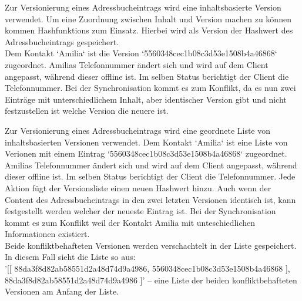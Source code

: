 \begin{description}[leftmargin=0.5cm,style=nextline]
  \item[Szenario V3 -- Inhaltsbasierte Version:]%
    Zur Versionierung eines Adressbucheintrags wird eine inhaltsbasierte Version verwendet. Um eine Zuordnung zwischen Inhalt und Version machen zu können kommen \Glspl{Hashfunktion} zum Einsatz. Hierbei wird als Version der Hashwert des Adressbucheintrags gespeichert.\\
    Dem Kontakt `Amilia` ist die Version `5560348cec1b08c3d53e1508b4a46868` zugeordnet. Amilias Telefonnummer ändert sich und wird auf dem Client angepasst, während dieser offline ist.
    Im selben Status berichtigt der Client die Telefonnummer. Bei der Synchronisation kommt es zum Konflikt, da es nun zwei Einträge mit unterschiedlichem Inhalt, aber identischer Version gibt und nicht festzustellen ist welche Version die neuere ist.\\
  \item[Szenario V4 -- Liste von inhaltsbasierten Versionen:]
    Zur Versionierung eines Adressbucheintrags wird eine geordnete Liste von inhaltsbasierten Versionen verwendet.
    Dem Kontakt `Amilia` ist eine Liste von Verionen mit einem Eintrag `5560348cec1b08c3d53e1508b4a46868` zugeordnet.
    Amilias Telefonnummer ändert sich und wird auf dem Client angepasst, während dieser offline ist. Im selben Status berichtigt der Client die Telefonnummer.
    Jede Aktion fügt der Versionsliste einen neuen Hashwert hinzu.
    Auch wenn der Content des Adressbucheintrags in den zwei letzten Versionen identisch ist, kann festgestellt werden welcher der neueste Eintrag ist.
    Bei der Synchronisation kommt es zum Konflikt weil der Kontakt Amilia mit unteschiedlichen Informationen existiert.\\
    Beide konfliktbehafteten Versionen werden verschachtelt in der Liste gespeichert.
    In diesem Fall sieht die Liste so aus: \\
    '[[ 88da3f8d82ab58551d2a48d74d9a4986, 5560348cec1b08c3d53e1508b4a46868 ], 88da3f8d82ab58551d2a48d74d9a4986 ]' -- eine Liste der beiden konfliktbehafteten Versionen am Anfang der Liste.
\end{description}
%
%
